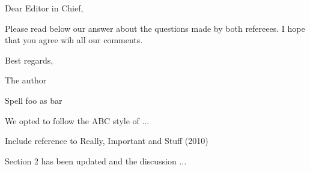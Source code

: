\documentclass[answers,12pt]{exam}
\begin{document}
Dear Editor in Chief, \bigskip

Please read below our answer about the \numquestions{}
questions made by  both refereees. I hope that you agree
wih all our comments. \bigskip

Best regards,\bigskip

The author

\begin{questions}
\question Spell foo as bar
\begin{solution}
 We opted to follow the ABC style of ... 
\end{solution}
\question  Include reference to Really, Important and Stuff (2010)
\begin{solution}
Section 2 has been updated and the discussion ... 
\end{solution}
\end{questions}
\end{document}
